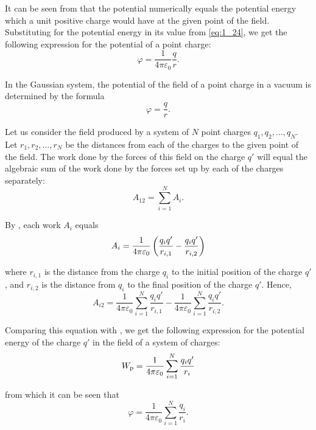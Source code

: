 It can be seen from  that the potential numerically equals the potential energy which a unit positive charge would have at the given point of the field. Substituting for the potential energy in  its value from \eqref{eq:1_24}, we get the following expression for the potential of a point charge:
\begin{equation}\label{eq:1_26}
	\varphi = \frac{1}{4\pi\varepsilon_0} \frac{q}{r}.
\end{equation}

In the Gaussian system, the potential of the field of a point charge in a vacuum is determined by the formula
\begin{equation}\label{eq:1_27}
	\varphi = \frac{q}{r}.
\end{equation}

Let us consider the field produced by a system of $N$ point charges $q_1, q_2,\ldots, q_N$. Let $r_1, r_2,\ldots, r_N$ be the distances from each of the charges to the given point of the field. The work done by the forces of this field on the charge $q'$ will equal the algebraic sum of the work done by the forces set up by each of the charges separately:
\begin{equation*}
	A_{12} = \sum_{i=1}^N A_i.
\end{equation*}

\noindent
By , each work $A_i$ equals
\begin{equation*}
	A_{i} = \frac{1}{4\pi\varepsilon_0} \left(
	\frac{q_i q'}{r_{i,1}} - \frac{q_i q'}{r_{i,2}}
	\right)
\end{equation*}

\noindent
where $r_{i,1}$ is the distance from the charge $q_i$ to the initial position of the charge $q'$, and $r_{i,2}$ is the distance from $q_i$ to the final position of the charge $q'$. Hence,
\begin{equation*}
	A_{i2} = \frac{1}{4\pi\varepsilon_0} \sum_{i=1}^N \frac{q_i q'}{r_{i,1}} - \frac{1}{4\pi\varepsilon_0} \sum_{i=1}^N \frac{q_i q'}{r_{i,2}}.
\end{equation*}

\noindent
Comparing this equation with , we get the following expression for the potential energy of the charge $q'$ in the field of a system of charges:
\begin{equation*}
	W_{\text{p}} = \frac{1}{4\pi\varepsilon_0} \sum_{i=1}^N \frac{q_i q'}{r_{i}}
\end{equation*}

\noindent
from which it can be seen that
\begin{equation}\label{eq:1_28}
	\varphi = \frac{1}{4\pi\varepsilon_0} \sum_{i=1}^N \frac{q_i}{r_{i}}.
\end{equation}

